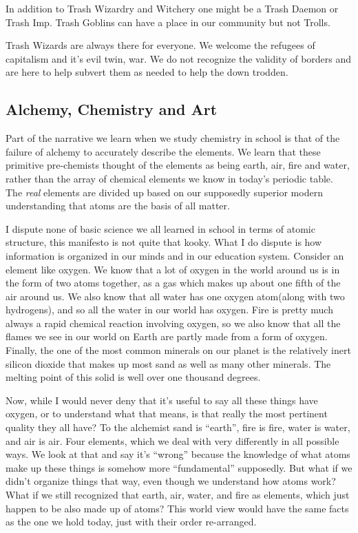 In addition to Trash Wizardry and Witchery one might be a Trash Daemon
or Trash Imp. Trash Goblins can have a place in our community but not
Trolls.

Trash Wizards are always there for everyone. We welcome the refugees of
capitalism and it's evil twin, war. We do not recognize the validity of
borders and are here to help subvert them as needed to help the down
trodden.

\subsection{Alchemy, Chemistry and Art}\label{alchemy-chemistry-and-art}

Part of the narrative we learn when we study chemistry in school is that
of the failure of alchemy to accurately describe the elements. We learn
that these primitive pre-chemists thought of the elements as being
earth, air, fire and water, rather than the array of chemical elements
we know in today's periodic table. The \emph{real} elements are divided
up based on our supposedly superior modern understanding that atoms are
the basis of all matter.

I dispute none of basic science we all learned in school in terms of
atomic structure, this manifesto is not quite that kooky. What I do
dispute is how information is organized in our minds and in our
education system. Consider an element like oxygen. We know that a lot of
oxygen in the world around us is in the form of two atoms together, as a
gas which makes up about one fifth of the air around us. We also know
that all water has one oxygen atom(along with two hydrogens), and so all
the water in our world has oxygen. Fire is pretty much always a rapid
chemical reaction involving oxygen, so we also know that all the flames
we see in our world on Earth are partly made from a form of oxygen.
Finally, the one of the most common minerals on our planet is the
relatively inert silicon dioxide that makes up most sand as well as many
other minerals. The melting point of this solid is well over one
thousand degrees.

Now, while I would never deny that it's useful to say all these things
have oxygen, or to understand what that means, is that really the most
pertinent quality they all have? To the alchemist sand is ``earth'',
fire is fire, water is water, and air is air. Four elements, which we
deal with very differently in all possible ways. We look at that and say
it's ``wrong'' because the knowledge of what atoms make up these things
is somehow more ``fundamental'' supposedly. But what if we didn't
organize things that way, even though we understand how atoms work? What
if we still recognized that earth, air, water, and fire as elements,
which just happen to be also made up of atoms? This world view would
have the same facts as the one we hold today, just with their order
re-arranged.

